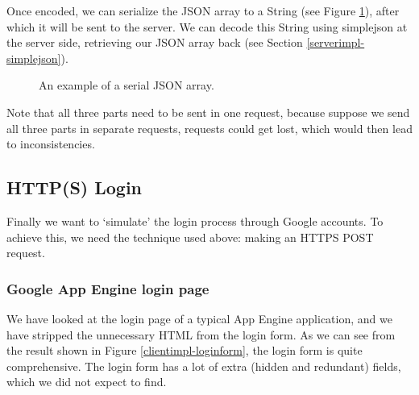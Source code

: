 Once encoded, we can serialize the JSON array to a String (see Figure
\ref{clientimpl-json}), after which it will be sent to the server. We can decode
this String using simplejson at the server side, retrieving our JSON array back
(see Section \ref{serverimpl-simplejson}). 

\begin{figure}[ht] %
\begin{center}
\begin{code}
["/home/bboterm/app-engine/",{"key1":"value1","key2":"value2","key3":"value3"},
  "R0lGODlh(...)KSAAOw=="]
\end{code}
\caption{An example of a serial JSON array.\label{clientimpl-json}}
\end{center}
\end{figure}

Note that all three parts need to be sent in one request, because suppose we send
all three parts in separate requests, requests could get lost, which would then
lead to inconsistencies.

\subsection{HTTP(S) Login}
Finally we want to `simulate' the login process through Google accounts. To
achieve this, we need the technique used above: making an HTTPS POST request.

\subsubsection{Google App Engine login page}
We have looked at the login page of a typical App Engine application, and we
have stripped the unnecessary HTML from the login form. As we can see from the
result shown in Figure \ref{clientimpl-loginform}, the login form is quite
comprehensive. The login form has a lot of extra (hidden and redundant) fields,
which we did not expect to find.

